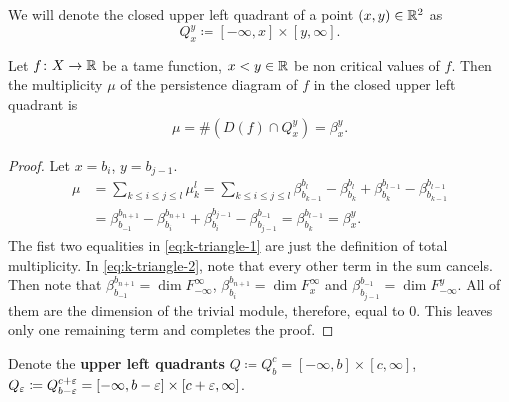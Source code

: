 We will denote the closed upper left quadrant of a point $ (x, y) \in \mathbb R^2 $ as 
\begin{equation}
    Q_x^y \coloneq [-\infty, x] \times [y, \infty].
\end{equation}

\begin{lemma} \label{lemma:k-triangle}
    Let $ f\colon X \to \mathbb R $ be a tame function, $ x < y \in \mathbb R $ be non critical values of $ f $. Then the multiplicity $\mu $ of the persistence diagram of $ f $ in the closed upper left quadrant is 
    \begin{align}
        \mu = \# (D(f) \cap Q_x^y) = \beta_x^y.
    \end{align}
\end{lemma}
\begin{proof}
    Let $ x = b_i $, $ y = b_{j-1} $.
    \begin{align} 
        \mu &= \sum_{k \leq i \leq j \leq l} \mu_k^l = \sum_{k \leq i \leq j \leq l} \beta_{b_{k-1}}^{b_l} - \beta_{b_k}^{b_l} + \beta_{b_k}^{b_{l-1}} - \beta_{b_{k-1}}^{b_{l-1}} \label{eq:k-triangle-1} \\
        &= \beta_{b_{-1}}^{b_{n+1}} - \beta_{b_i}^{b_{n+1}} + \beta_{b_i}^{b_{j-1}} - \beta_{b_{j-1}}^{b_{-1}} = \beta_{b_k}^{b_{l-1}} = \beta_x^y. \label{eq:k-triangle-2}
    \end{align}
    The fist two equalities in \eqref{eq:k-triangle-1} are just the definition of total multiplicity. In \eqref{eq:k-triangle-2}, note that every other term in the sum cancels. Then note that $ \beta_{b_{-1}}^{b_{n+1}} = \dim F_{-\infty}^{\infty} $, $ \beta_{b_i}^{b_{n+1}} = \dim F_{x}^{\infty} $ and $ \beta_{b_{j-1}}^{b_{-1}} = \dim F_{-\infty}^y $. All of them are the dimension of the trivial module, therefore, equal to $ 0 $. This leaves only one remaining term and completes the proof.
\end{proof}

Denote the {\bf upper left quadrants} $ Q \coloneq Q_b^c = [-\infty, b] \times [c, \infty] $, $ Q_\varepsilon \coloneq Q_{b-\varepsilon}^{c+\varepsilon} = [-\infty, b-\varepsilon] \times [c+\varepsilon, \infty] $.

